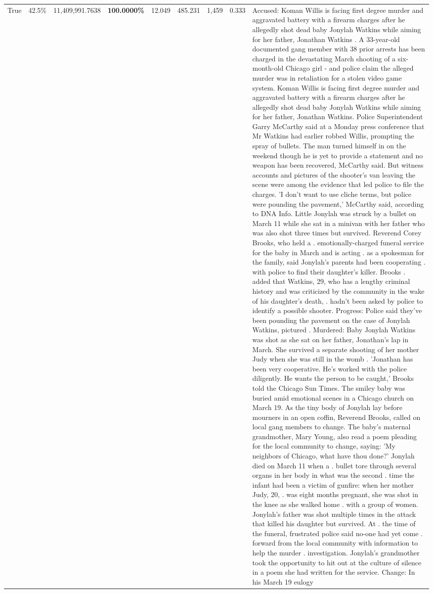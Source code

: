 \begin{table}[H]
\begin{tabular}{lllrlllll}
True & 42.5\% & 11,409,991.7638 & \bfseries \color{red} 100.0000\% & 12.049 & 485.231 & 1,459 & 0.333 & Accused: Koman Willis is facing first degree murder and aggravated battery with a firearm charges after he allegedly shot dead baby Jonylah Watkins while aiming for her father, Jonathan Watkins . A 33-year-old documented gang member with 38 prior arrests has been charged in the devastating March shooting of a six-month-old Chicago girl - and police claim the alleged murder was in retaliation for a stolen video game system. Koman Willis is facing first degree murder and aggravated battery with a firearm charges after he allegedly shot dead baby Jonylah Watkins while aiming for her father, Jonathan Watkins. Police Superintendent Garry McCarthy said at a Monday press conference that Mr Watkins had earlier robbed Willis, prompting the spray of bullets. The man turned himself in on the weekend though he is yet to provide a statement and no weapon has been recovered, McCarthy said. But witness accounts and pictures of the shooter's van leaving the scene were among the evidence that led police to file the charges. 'I don't want to use cliche terms, but police were pounding the pavement,' McCarthy said, according to DNA Info. Little Jonylah was struck by a bullet on March 11 while she sat in a minivan with her father who was also shot three times but survived. Reverend Corey Brooks, who held a . emotionally-charged funeral service for the baby in March and is acting . as a spokesman for the family, said Jonylah's parents had been cooperating . with police to find their daughter's killer. Brooks . added that Watkins, 29, who has a lengthy criminal history and was criticized by the community in the wake of his daughter's death, . hadn't been asked by police to identify a possible shooter. Progress: Police said they've been pounding the pavement on the case of Jonylah Watkins, pictured . Murdered: Baby Jonylah Watkins was shot as she sat on her father, Jonathan's lap in March. She survived a separate shooting of her mother Judy when she was still in the womb . 'Jonathan has been very cooperative. He's worked with the police diligently. He wants the person to be caught,' Brooks told the Chicago Sun Times. The smiley baby was buried amid emotional scenes in a Chicago church on March 19. As the tiny body of Jonylah lay before mourners in an open coffin, Reverend Brooks, called on local gang members to change. The baby's maternal grandmother, Mary Young, also read a poem pleading for the local community to change, saying: 'My neighbors of Chicago, what have thou done?' Jonylah died on March 11 when a . bullet tore through several organs in her body in what was the second . time the infant had been a victim of gunfire: when her mother Judy, 20, . was eight months pregnant, she was shot in the knee as she walked home . with a group of women. Jonylah's father was shot multiple times in the attack that killed his daughter but survived. At . the time of the funeral, frustrated police said no-one had yet come . forward from the local community with information to help the murder . investigation. Jonylah's grandmother took the opportunity to hit out at the culture of silence in a poem she had written for the service. Change: In his March 19 eulogy 
\end{tabular}
\end{table}
